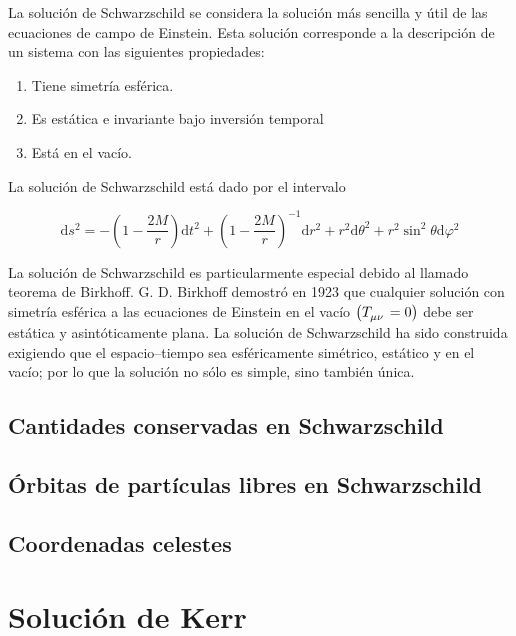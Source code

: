 \documentclass[11pt]{article}
\begin{document}
La solución de Schwarzschild se considera la solución más sencilla y útil de las ecuaciones de campo de Einstein. Esta solución corresponde a la descripción de un sistema con las siguientes propiedades: \cite{Luminet_1979} \cite{Amarilla_2012} \cite{Amarilla_2018}

\begin{enumerate}
\item Tiene simetría esférica.
\item Es estática e invariante bajo inversión temporal
\item Está en el vacío. 
\end{enumerate}

La solución de Schwarzschild está dado por el intervalo

\begin{equation}
\text{d}s^{2} = -\left( 1 - \dfrac{2M}{r} \right)\text{d}t^{2} + \left( 1 - \dfrac{2M}{r} \right)^{-1}\text{d}r^{2}
+ r^{2}\text{d}\theta^{2} + r^{2}\sin^{2}\theta\text{d}\varphi^{2}
\label{ec:intervalo Schwarzschild}
\end{equation}

La solución de Schwarzschild es particularmente especial debido al llamado teorema de Birkhoff. G. D. Birkhoff demostró en 1923 que cualquier solución con simetría esférica a las ecuaciones de Einstein en el vacío $ \left( \tensor{T}{_\mu_\nu} = 0 \right) $ debe ser estática y asintóticamente plana. La solución de Schwarzschild ha sido construida exigiendo que el espacio–tiempo sea esféricamente simétrico, estático y en el vacío; por lo que la solución no sólo es simple, sino también única.

\subsection{Cantidades conservadas en Schwarzschild}

\subsection{Órbitas de partículas libres en Schwarzschild}

\subsection{Coordenadas celestes}

\section{Solución de Kerr}
\end{document}
